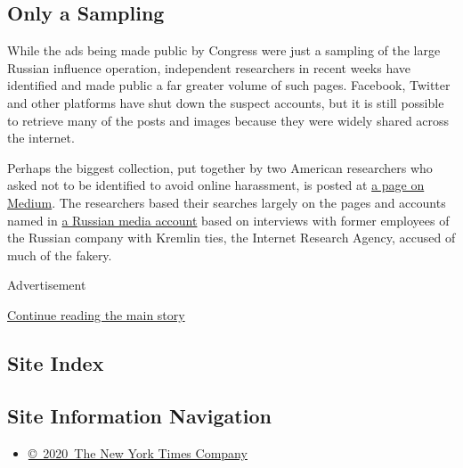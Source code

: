 \hypertarget{only-a-sampling}{%
\subsection{Only a Sampling}\label{only-a-sampling}}

While the ads being made public by Congress were just a sampling of the
large Russian influence operation, independent researchers in recent
weeks have identified and made public a far greater volume of such
pages. Facebook, Twitter and other platforms have shut down the suspect
accounts, but it is still possible to retrieve many of the posts and
images because they were widely shared across the internet.

Perhaps the biggest collection, put together by two American researchers
who asked not to be identified to avoid online harassment, is posted at
\href{https://medium.com/@ushadrons}{a page on Medium}. The researchers
based their searches largely on the pages and accounts named in
\href{http://www.rbc.ru/magazine/2017/11/59e0c17d9a79470e05a9e6c1}{a
Russian media account} based on interviews with former employees of the
Russian company with Kremlin ties, the Internet Research Agency, accused
of much of the fakery.

Advertisement

\protect\hyperlink{after-bottom}{Continue reading the main story}

\hypertarget{site-index}{%
\subsection{Site Index}\label{site-index}}

\hypertarget{site-information-navigation}{%
\subsection{Site Information
Navigation}\label{site-information-navigation}}

\begin{itemize}
\tightlist
\item
  \href{https://help.nytimes.com/hc/en-us/articles/115014792127-Copyright-notice}{©~2020~The
  New York Times Company}
\end{itemize}

